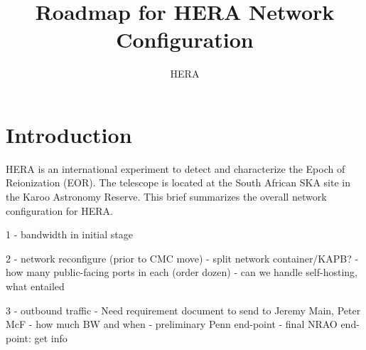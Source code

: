 \documentclass{article}
\begin{document}
\author{HERA}
\title{Roadmap for HERA Network Configuration}
\maketitle

\section{Introduction}
HERA is an international experiment to detect and characterize the Epoch of Reionization (EOR).  The telescope is located at the South African SKA site in the Karoo
Astronomy Reserve.  This brief summarizes the overall network configuration for HERA.

1 - bandwidth in initial stage

2 - network reconfigure (prior to CMC move)
    - split network container/KAPB?
    - how many public-facing ports in each (order dozen)
    - can we handle self-hosting, what entailed

3 - outbound traffic
    - Need requirement document to send to Jeremy Main, Peter McF
        - how much BW and when
        - preliminary Penn end-point
        - final NRAO end-point:  get info

\end{document}
